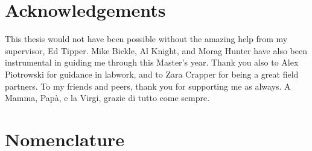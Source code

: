 \documentclass[hidelinks, 12pt]{article} %
\begin{document}

\newpage


\tableofcontents


\newpage


\section*{Acknowledgements}

This thesis would not have been possible without the amazing help from my supervisor, Ed Tipper. Mike Bickle, Al Knight, and Morag Hunter have also been instrumental in guiding me through this Master's year. Thank you also to Alex Piotrowski for guidance in labwork, and to Zara Crapper for being a great field partners. To my friends and peers, thank you for supporting me as always. A Mamma, Papà, e la Virgi, grazie di tutto come sempre. 


\newpage

\section*{Nomenclature}
\end{document}
